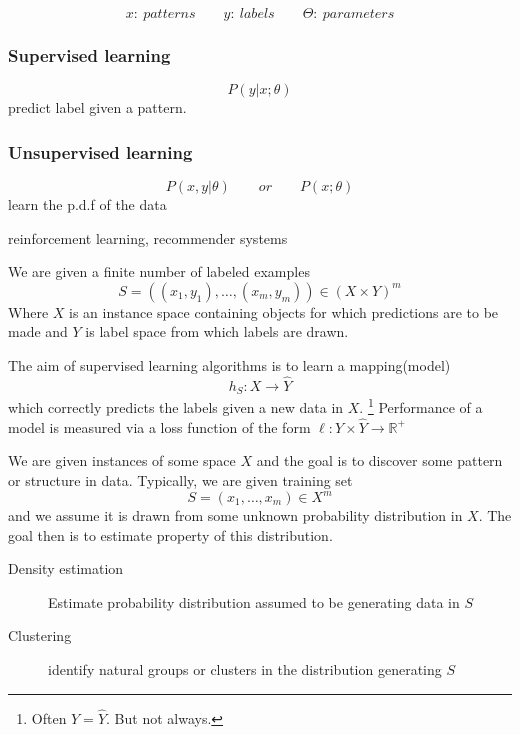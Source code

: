\begin{slide}[Basics]
  $$x:~patterns \qquad y:~labels \qquad \Theta:~parameters$$
  \begin{multicols}{2}
    \subsubsection*{Supervised learning}
      $$P(y|x;\theta)$$
      predict label given a pattern.
    \subsubsection*{Unsupervised learning}
      $$P(x,y |\theta) \qquad or \qquad P(x;\theta)  $$
      learn the p.d.f of the data
  \end{multicols}
  reinforcement learning, recommender systems
\end{slide}
\begin{slide}
We are given a finite number of labeled examples 
$$S=((x_1,y_1),\ldots,(x_m,y_m))\in(X\times Y)^m$$
Where $X$ is an instance space containing objects for which predictions are to be made and $Y$ is label space from which labels are drawn.
\par
The aim of supervised learning algorithms is to learn a mapping(model)
$$h_S:X\to\hat{Y}$$ which correctly predicts the labels given a new data in $X$. \footnote{Often $Y=\hat{Y}$. But not always.}
Performance of a model is measured via a loss function of the form $\ell:Y\times\hat{Y}\to \mathbb{R}^+$
\end{slide}



\begin{slide}
	We are given instances of some space $X$ and the goal is to discover some pattern or structure in data. Typically, we are given training set
	$$S=(x_1,\ldots,x_m)\in X^m$$
	and we assume it is drawn from some unknown probability distribution in $X$. The goal then is to estimate property of this distribution.
	\begin{description}
		\item[Density estimation] Estimate probability distribution assumed to be generating data in $S$
		\item[Clustering] identify natural groups or clusters in the distribution generating $S$
	\end{description}
\end{slide}

